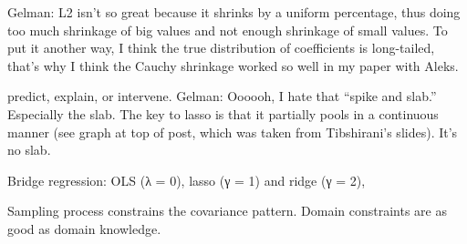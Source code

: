 \documentclass{article}
\begin{document}
Gelman: L2 isn’t so great because it shrinks by a uniform percentage, thus doing too much shrinkage of big values and not enough shrinkage of small values. To put it another way, I think the true distribution of coefficients is long-tailed, that’s why I think the Cauchy shrinkage worked so well in my paper with Aleks.

predict, explain, or intervene. 
Gelman: Oooooh, I hate that “spike and slab.” Especially the slab. The key to lasso is that it partially pools in a continuous manner (see graph at top of post, which was taken from Tibshirani’s slides). It’s no slab.

Bridge regression: OLS (λ = 0), lasso (γ = 1) and ridge  (γ = 2), 

Sampling process constrains the covariance pattern. Domain constraints are as good as domain knowledge. 
\end{document}
